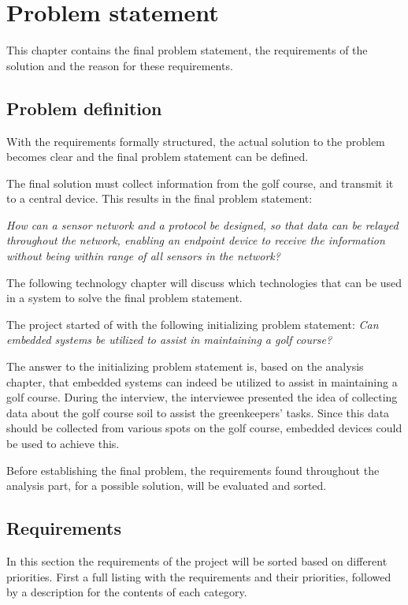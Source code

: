 \chapter{Problem statement}
This chapter contains the final problem statement, the requirements of the solution and the reason for these requirements.

\section{Problem definition}
With the requirements formally structured, the actual solution to the problem becomes clear and the final problem statement can be defined.

The final solution must collect information from the golf course, and transmit it to a central device. This results in the final problem statement:

\textit{How can a sensor network and a protocol be designed, so that data can be relayed throughout the network, enabling an endpoint device to receive the information without being within range of all sensors in the network?}

The following technology chapter will discuss which technologies that can be used in a system to solve the final problem statement.

The project started of with the following initializing problem statement:
\textit{Can embedded systems be utilized to assist in maintaining a golf course?}

The answer to the initializing problem statement is, based on the analysis chapter, that embedded systems can indeed be utilized to assist in maintaining a golf course. During the interview, the interviewee presented the idea of collecting data about the golf course soil to assist the greenkeepers' tasks. Since this data should be collected from various spots on the golf course, embedded devices could be used to achieve this.

Before establishing the final problem, the requirements found throughout the analysis part, for a possible solution, will be evaluated and sorted.

\section{Requirements}
In this section the requirements of the project will be sorted based on different priorities. First a full listing with the requirements and their priorities, followed by a description for the contents of each category.

